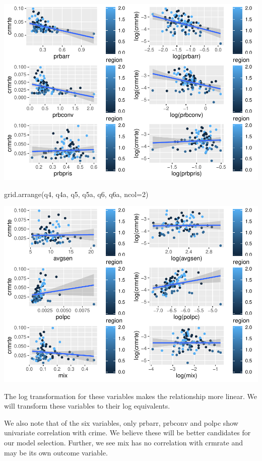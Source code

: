 \documentclass[]{article}
\newenvironment{Shaded}{}{}
\newcommand{\DataTypeTok}[1]{#1}
\newcommand{\DecValTok}[1]{#1}
\newcommand{\KeywordTok}[1]{\textcolor[rgb]{0.00,0.00,1.00}{#1}}
\newcommand{\NormalTok}[1]{#1}
\begin{document}
\includegraphics{Bagnard_Gaustad_Hartman_Leung_Lab_3_files/figure-latex/unnamed-chunk-49-1.pdf}

\begin{Shaded}
\begin{Highlighting}[]
\KeywordTok{grid.arrange}\NormalTok{(q4, q4a, q5, q5a, q6, q6a, }\DataTypeTok{ncol=}\DecValTok{2}\NormalTok{)}
\end{Highlighting}
\end{Shaded}

\includegraphics{Bagnard_Gaustad_Hartman_Leung_Lab_3_files/figure-latex/unnamed-chunk-49-2.pdf}

The log transformation for these variables makes the relationship more
linear. We will transform these variables to their log equivalents.

We also note that of the six variables, only prbarr, prbconv and polpc
show univariate correlation with crime. We believe these will be better
candidates for our model selection. Further, we see mix has no
correlation with crmrate and may be its own outcome variable.
\end{document}
